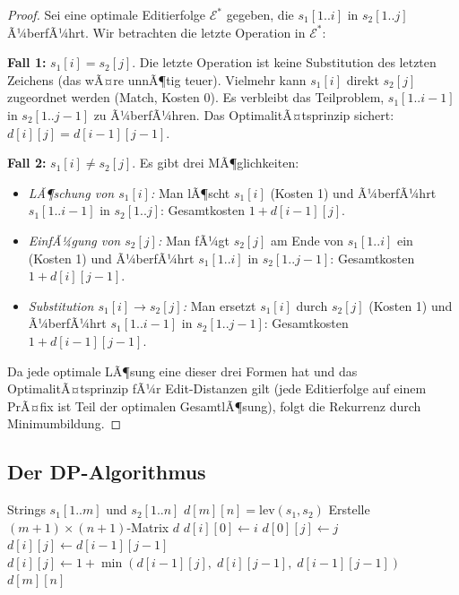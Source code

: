 ﻿\documentclass[a4paper,12pt]{article}
\theoremstyle{definition}
\begin{document}
\begin{proof}
    Sei eine optimale Editierfolge $\mathcal{E}^*$ gegeben, die $s_1[1..i]$ in
    $s_2[1..j]$ Ã¼berfÃ¼hrt. Wir betrachten die letzte Operation in $\mathcal{E}^*$:

    \textbf{Fall 1:} $s_1[i] = s_2[j]$.
    Die letzte Operation ist keine Substitution des letzten Zeichens
    (das wÃ¤re unnÃ¶tig teuer). Vielmehr kann $s_1[i]$ direkt $s_2[j]$ zugeordnet
    werden (Match, Kosten 0). Es verbleibt das Teilproblem, $s_1[1..i-1]$ in
    $s_2[1..j-1]$ zu Ã¼berfÃ¼hren. Das OptimalitÃ¤tsprinzip sichert:
    $d[i][j] = d[i-1][j-1]$.

    \textbf{Fall 2:} $s_1[i] \neq s_2[j]$. Es gibt drei MÃ¶glichkeiten:
    \begin{itemize}
        \item \emph{LÃ¶schung von $s_1[i]$:} Man lÃ¶scht $s_1[i]$ (Kosten 1) und
              Ã¼berfÃ¼hrt $s_1[1..i-1]$ in $s_2[1..j]$: Gesamtkosten $1 + d[i-1][j]$.
        \item \emph{EinfÃ¼gung von $s_2[j]$:} Man fÃ¼gt $s_2[j]$ am Ende von
              $s_1[1..i]$ ein (Kosten 1) und Ã¼berfÃ¼hrt $s_1[1..i]$ in
              $s_2[1..j-1]$: Gesamtkosten $1 + d[i][j-1]$.
        \item \emph{Substitution $s_1[i] \to s_2[j]$:} Man ersetzt $s_1[i]$ durch
              $s_2[j]$ (Kosten 1) und Ã¼berfÃ¼hrt $s_1[1..i-1]$ in $s_2[1..j-1]$:
              Gesamtkosten $1 + d[i-1][j-1]$.
    \end{itemize}
    Da jede optimale LÃ¶sung eine dieser drei Formen hat und das OptimalitÃ¤tsprinzip
    fÃ¼r Edit-Distanzen gilt (jede Editierfolge auf einem PrÃ¤fix ist Teil der
    optimalen GesamtlÃ¶sung), folgt die Rekurrenz durch Minimumbildung. \qedhere
\end{proof}

\subsection{Der DP-Algorithmus}

\begin{algorithm}[H]
\caption{Levenshtein-Distanz (Bottom-Up DP)}
\label{alg:levenshtein}
\begin{algorithmic}[1]
\Require Strings $s_1[1..m]$ und $s_2[1..n]$
\Ensure $d[m][n] = \mathrm{lev}(s_1, s_2)$
\State Erstelle $(m+1) \times (n+1)$-Matrix $d$
 $d[i][0] \gets i$ \EndFor
{} $d[0][j] \gets j$ \EndFor
{}
            \State $d[i][j] \gets d[i-1][j-1]$
        \Else
            \State $d[i][j] \gets 1 + \min(d[i-1][j],\; d[i][j-1],\; d[i-1][j-1])$
        \EndIf
    \EndFor
\EndFor
\State \Return $d[m][n]$
\end{algorithmic}
\end{algorithm}
\end{document}
